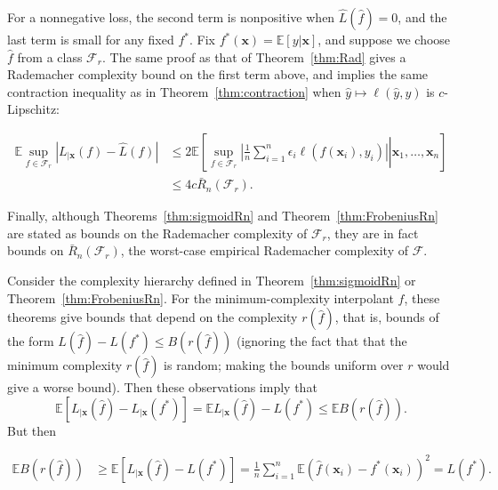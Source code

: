 For a nonnegative loss, the second term is nonpositive when $\widehat
L(\widehat f)=0$, and the last term is small for any fixed $f^*$. Fix $f^*({\boldsymbol x})={\mathbb E}[y|{\boldsymbol x}]$, and suppose we choose $\widehat f$ from a class ${\mathcal F}_r$. The same proof as that of Theorem~\ref{thm:Rad}
gives a Rademacher complexity bound on the first term above, and
\cite[Theorem~4.12]{lt-pbsip-91} implies the same contraction inequality as in Theorem~\ref{thm:contraction} when $\widehat
y\mapsto\ell(\widehat y,y)$ is $c$-Lipschitz:

\begin{align*}
    {\mathbb E}\sup_{f\in{\mathcal F}_r} \left|L_{|{\boldsymbol x}}(f) - \widehat L(f)\right|
    &\le 2 {\mathbb E}\left[\left.
      \sup_{f\in{\mathcal F}_r}
      \left|\frac{1}{n}\sum_{i=1}^n \epsilon_i \ell(f({\boldsymbol x}_i),y_i)\right|
      \right|{\boldsymbol x}_1,\ldots,{\boldsymbol x}_n\right] \\

    &\le 4c \bar R_n({\mathcal F}_r).
  \end{align*}

Finally, although Theorems~\ref{thm:sigmoidRn} and
Theorem~\ref{thm:FrobeniusRn} are stated as bounds on the Rademacher complexity of ${\mathcal F}_r$, they are in fact bounds on $\bar R_n({\mathcal F}_r)$, the worst-case empirical Rademacher complexity of ${\mathcal F}$.

Consider the complexity hierarchy defined in Theorem~\ref{thm:sigmoidRn} 
or Theorem~\ref{thm:FrobeniusRn}.
For the minimum-complexity interpolant $\widehat f$, these theorems give bounds that depend on the complexity $r(\widehat f)$, that is, bounds of the form $L(\widehat f)-L(f^*)\le B(r(\widehat f))$ (ignoring the fact that that the minimum complexity $r(\widehat f)$ is random; making the bounds uniform over $r$ would give a worse bound). Then these observations imply that
  \[
    {\mathbb E} \left[L_{|{\boldsymbol x}}(\widehat f) - L_{|{\boldsymbol x}}(f^*)\right]
    = {\mathbb E} L_{|{\boldsymbol x}}(\widehat f) - L(f^*) \le {\mathbb E} B(r(\widehat f)).
  \]
But  then

\begin{align*}
    {\mathbb E} B(r(\widehat f)) & \ge {\mathbb E}\left[L_{|{\boldsymbol x}}(\widehat f) - L(f^*)\right] 
    = \frac{1}{n}\sum_{i=1}^n{\mathbb E}\left(\widehat f({\boldsymbol x}_i)-f^*({\boldsymbol x}_i)\right)^2

    = L(f^*).
  \end{align*}

